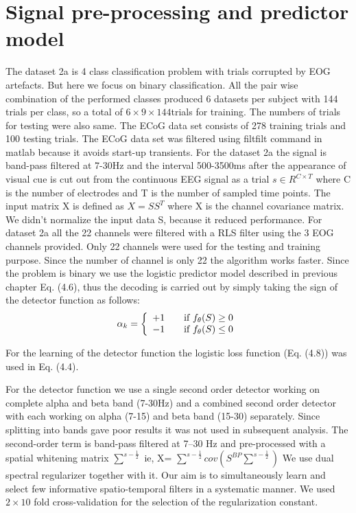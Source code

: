 \section{Signal pre-processing and predictor model}
The dataset 2a is 4 class classification problem with trials corrupted by EOG artefacts. But here we focus on binary classification. All the pair wise combination of the performed classes produced 6 datasets per subject with 144 trials per class, so a total of $6\times 9\times 144  $trials for training. The numbers of trials for testing were also same. The ECoG data set consists of 278 training trials and 100 testing trials. The ECoG data set was filtered using filtfilt command in matlab because it avoids start-up transients. For the dataset 2a the signal is band-pass filtered at 7-30Hz and the interval 500-3500ms after the appearance of visual cue is cut out from the continuous EEG signal as a trial $ s\in R^{C\times T} $ where C is the number of electrodes and T is the number of sampled time points. The input matrix X is defined as $ X=SS^{T} $ where X is the channel covariance matrix. We didn’t normalize the input data S, because it reduced performance. For dataset 2a all the 22 channels were filtered with a RLS filter using the 3 EOG channels provided. Only 22 channels were used for the testing and training purpose. Since the number of channel is only 22 the algorithm works faster. Since the problem is binary we use the logistic predictor model described in previous chapter Eq. (4.6), thus the decoding is carried out by simply taking the sign of the detector function as follows:
\[  \alpha_{k}  = \left\{ 
  \begin{array}{l l}
    +1  & \quad \text{if $ f_{\theta}(S)\geq 0 $}\\
    -1 & \quad \text{if $ f_{\theta}(S)\leq 0 $}
  \end{array} \right.\]
  
  For the learning of the detector function the logistic loss function (Eq. (4.8)) was used in Eq. (4.4).
  
  For the detector function we use a single second order detector working on complete alpha and beta band (7-30Hz) and a combined second order detector with each working on alpha (7-15) and beta band (15-30) separately. Since splitting into bands gave poor results it was not used in subsequent analysis. The second-order term is band-pass filtered at 7–30 Hz and pre-processed with a spatial whitening matrix $\sum^{s-\frac{1}{2}}$ ie, X= $\sum^{s-\frac{1}{2}}cov(S^{BP}\sum^{s-\frac{1}{2}})$ We use dual spectral regularizer together with it. Our aim is to simultaneously learn and select few informative spatio-temporal filters in a systematic manner. We used $ 2\times 10 $ fold cross-validation for the selection of the regularization constant.
